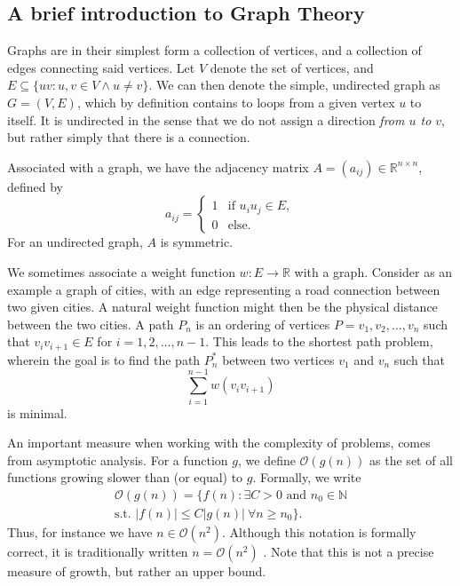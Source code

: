 \subsection{A brief introduction to Graph Theory}
Graphs are in their simplest form a collection of vertices, and a collection of edges connecting said vertices.
Let $V$ denote the set of vertices, and $E \subseteq \{ uv : u,v \in V \wedge u \neq v \}$.
We can then denote the simple, undirected graph as $G = (V, E)$, which by definition contains to loops from a given vertex $u$ to itself.
It is undirected in the sense that we do not assign a direction \textit{from $u$ to $v$}, but rather simply that there is a connection.

Associated with a graph, we have the adjacency matrix $A = (a_{ij}) \in \mathbb{R}^{n \times n}$, defined by
\begin{equation}
    a_{ij} = 
    \begin{cases}
        1 & \text{if } u_i u_j \in E, \\
        0 & \text{else}.
    \end{cases}
\end{equation}
For an undirected graph, $A$ is symmetric.

We sometimes associate a weight function $w: E \to \mathbb{R}$ with a graph.
Consider as an example a graph of cities, with an edge representing a road connection between two given cities.
A natural weight function might then be the physical distance between the two cities.
A path $P_n$ is an ordering of vertices $P=v_1, v_2, \ldots, v_n$ such that $v_i v_{i+1} \in E$ for $i = 1, 2, \ldots, n-1$.
This leads to the shortest path problem, wherein the goal is to find the path $P_n^*$ between two vertices $v_1$ and $v_n$ such that
\begin{equation}
    \sum_{i = 1}^{n - 1} w(v_{i}v_{i+1})
\end{equation}
is minimal.

An important measure when working with the complexity of problems, comes from asymptotic analysis.
For a function $g$, we define $\mathcal{O}(g(n))$ as the set of all functions growing slower than (or equal) to $g$. Formally, we write
\begin{multline}
    \mathcal{O}(g(n)) = \{ f(n) : \exists C > 0 \text{ and } n_0 \in \mathbb{N} \\
    \text{s.t. } |f(n)| \leq C |g(n)| \ \forall n \geq n_0 \}.
\end{multline}
Thus, for instance we have $n \in \mathcal{O}(n^2)$.
Although this notation is formally correct, it is traditionally written $n = \mathcal{O}(n^2)$ \cite{aigner2023discrete}.
Note that this is not a precise measure of growth, but rather an upper bound.

